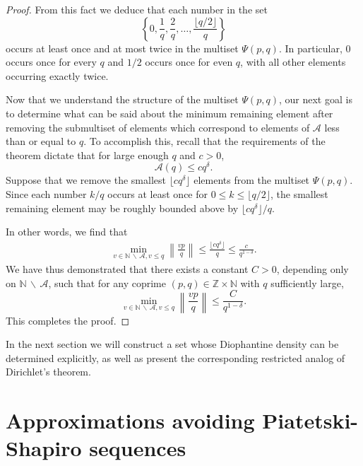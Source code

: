 \documentclass[reqno]{amsart}
\theoremstyle{definition}
\newcommand{\dnint}[1]{\left\|{#1}\right\|}
\begin{document}
\begin{proof}
From this fact we deduce that each number in the set
\begin{equation*}
\left\{0,\frac{1}{q},\frac{2}{q},\dots,\frac{\lfloor{q/2}\rfloor}{q}\right\}
\end{equation*}
occurs at least once and at most twice in the multiset $\Psi(p,q)$.  In particular, $0$ occurs once for every $q$ and $1/2$ occurs once for even $q$, with all other elements occurring exactly twice.

Now that we understand the structure of the multiset $\Psi(p,q)$, our next goal is to determine what can be said about the minimum remaining element after removing the submultiset of elements which correspond to elements of $\mathcal{A}$ less than or equal to $q$.  To accomplish this, recall that the requirements of the theorem dictate that for large enough $q$ and $c > 0$,
\begin{equation*}
\mathcal{A}(q) \leq c q^{\delta}.
\end{equation*}
Suppose that we remove the smallest $\lfloor{c q^{\delta}}\rfloor$ elements from the multiset $\Psi(p,q)$.  Since each number $k/q$ occurs at least once for $0 \leq k \leq \lfloor{q/2}\rfloor$, the smallest remaining element may be roughly bounded above by ${\lfloor{c q^{\delta}}\rfloor/q}$.

In other words, we find that
\begin{align*}
\min_{v\in\mathbb{N} \,\backslash \,\mathcal{A}, v\leq q}\dnint{\frac{v p}{q}} \leq \frac{\lfloor{c q^{\delta}}\rfloor}{q} \leq \frac{c}{q^{1-\delta}}.
\end{align*}
We have thus demonstrated that there exists a constant $C > 0$, depending only on $\mathbb{N} \,\backslash \,\mathcal{A}$, such  that for any coprime $(p,q)\in\mathbb{Z}\times\mathbb{N}$ with $q$ sufficiently large,
\begin{equation*}
    \min_{v\in\mathbb{N} \,\backslash \,\mathcal{A}, v\leq q}\dnint{\frac{v p}{q}} \leq \frac{C}{q^{1-\delta}}.
\end{equation*}
This completes the proof.
\end{proof}

In the next section we will construct a set whose Diophantine density can be determined explicitly, as well as present the corresponding restricted analog of Dirichlet's theorem.

\section{Approximations avoiding Piatetski-Shapiro sequences}
\end{document}
